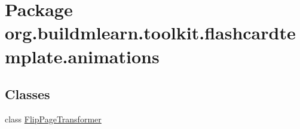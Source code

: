 \hypertarget{namespaceorg_1_1buildmlearn_1_1toolkit_1_1flashcardtemplate_1_1animations}{}\section{Package org.\+buildmlearn.\+toolkit.\+flashcardtemplate.\+animations}
\label{namespaceorg_1_1buildmlearn_1_1toolkit_1_1flashcardtemplate_1_1animations}
\subsection*{Classes}
\begin{DoxyCompactItemize}
\item 
class \hyperlink{classorg_1_1buildmlearn_1_1toolkit_1_1flashcardtemplate_1_1animations_1_1FlipPageTransformer}{Flip\+Page\+Transformer}
\end{DoxyCompactItemize}
